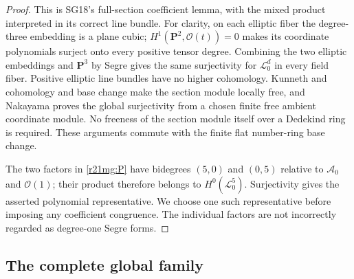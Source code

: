 \begin{proof}
This is SG18's full-section coefficient lemma, with the mixed
product interpreted in its correct line bundle.  For clarity, on
each elliptic fiber the degree-three embedding is a plane cubic;
$H^1(\mathbf P^2,\mathcal O(t))=0$ makes its coordinate polynomials
surject onto every positive tensor degree.  Combining the two
elliptic embeddings and $\mathbf P^3$ by Segre gives the same
surjectivity for $\mathcal L_0^d$ in every field fiber.  Positive
elliptic line bundles have no higher cohomology.  Kunneth and
cohomology and base change make the section module locally free,
and Nakayama proves the global surjectivity from a chosen finite
free ambient coordinate module.  No freeness of the section module
itself over a Dedekind ring is required.  These arguments commute
with the finite flat number-ring base change.

The two factors in \eqref{r21mg:P} have bidegrees $(5,0)$ and
$(0,5)$ relative to $\mathcal A_0$ and $\mathcal O(1)$; their product
therefore belongs to $H^0(\mathcal L_0^5)$.  Surjectivity gives the
asserted polynomial representative.  We choose one such representative
before imposing any coefficient congruence.  The individual factors
are not incorrectly regarded as degree-one Segre forms.
\end{proof}

\subsection{The complete global family}

